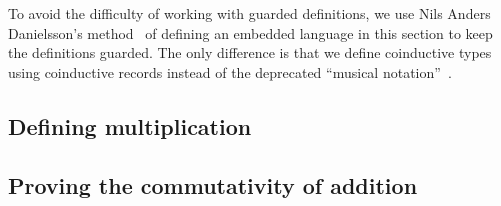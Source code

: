 To avoid the difficulty of working with guarded definitions, we use Nils Anders
Danielsson's method~\cite{danielsson-beating} of defining an embedded language
in this section to keep the definitions guarded. The only difference is that we
define coinductive types using coinductive records instead of the deprecated
``musical notation''~\cite{agda-coinduction}.

\subsection{Defining multiplication}\label{sec:dsl-mul}


\subsection{Proving the commutativity of addition}\label{sec:dsl-comm}


